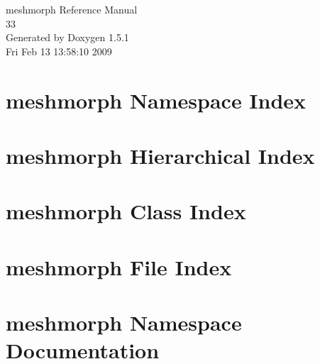 \documentclass[a4paper]{book}
\begin{document}
\begin{titlepage}
\vspace*{7cm}
\begin{center}
{\Large meshmorph Reference Manual\\[1ex]\large 33 }\\
\vspace*{1cm}
{\large Generated by Doxygen 1.5.1}\\
\vspace*{0.5cm}
{\small Fri Feb 13 13:58:10 2009}\\
\end{center}
\end{titlepage}
\clearemptydoublepage
{}
\tableofcontents
\clearemptydoublepage
{}
\chapter{meshmorph Namespace Index}

\chapter{meshmorph Hierarchical Index}

\chapter{meshmorph Class Index}

\chapter{meshmorph File Index}

\chapter{meshmorph Namespace Documentation}




\end{document}

